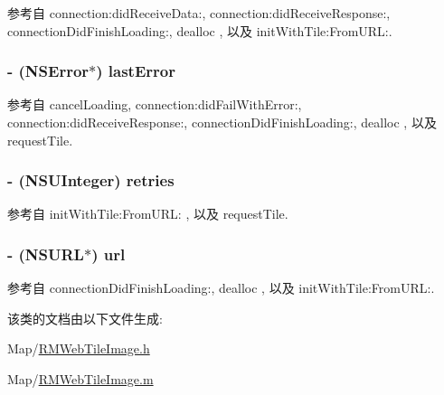 参考自 connection\-:did\-Receive\-Data\-:, connection\-:did\-Receive\-Response\-:, connection\-Did\-Finish\-Loading\-:, dealloc , 以及 init\-With\-Tile\-:\-From\-U\-R\-L\-:.

\hypertarget{interface_r_m_web_tile_image_a86f1240b8d10b5984a264f371e498521}{
\subsubsection[{last\-Error}]{\setlength{\rightskip}{0pt plus 5cm}-\/ (N\-S\-Error$\ast$) last\-Error\hspace{0.3cm}{\ttfamily [protected]}}}\label{interface_r_m_web_tile_image_a86f1240b8d10b5984a264f371e498521}


参考自 cancel\-Loading, connection\-:did\-Fail\-With\-Error\-:, connection\-:did\-Receive\-Response\-:, connection\-Did\-Finish\-Loading\-:, dealloc , 以及 request\-Tile.

\hypertarget{interface_r_m_web_tile_image_a77a8f8934bc1ed15620c1eb8cce80acd}{
\subsubsection[{retries}]{\setlength{\rightskip}{0pt plus 5cm}-\/ (N\-S\-U\-Integer) retries\hspace{0.3cm}{\ttfamily [protected]}}}\label{interface_r_m_web_tile_image_a77a8f8934bc1ed15620c1eb8cce80acd}


参考自 init\-With\-Tile\-:\-From\-U\-R\-L\-: , 以及 request\-Tile.

\hypertarget{interface_r_m_web_tile_image_a8229553e4e17a3f5d79d03e66adab84b}{
\subsubsection[{url}]{\setlength{\rightskip}{0pt plus 5cm}-\/ (N\-S\-U\-R\-L$\ast$) url\hspace{0.3cm}{\ttfamily [protected]}}}\label{interface_r_m_web_tile_image_a8229553e4e17a3f5d79d03e66adab84b}


参考自 connection\-Did\-Finish\-Loading\-:, dealloc , 以及 init\-With\-Tile\-:\-From\-U\-R\-L\-:.



该类的文档由以下文件生成\-:\begin{DoxyCompactItemize}
\item 
Map/\hyperlink{_r_m_web_tile_image_8h}{R\-M\-Web\-Tile\-Image.\-h}\item 
Map/\hyperlink{_r_m_web_tile_image_8m}{R\-M\-Web\-Tile\-Image.\-m}\end{DoxyCompactItemize}
